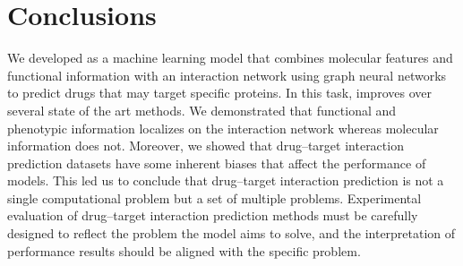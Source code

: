 \documentclass{bioinfo}
\begin{document}












\section{Conclusions}

We developed \name{} as a machine learning model that combines
molecular features and functional information with an interaction
network using graph neural networks to predict drugs that may target
specific proteins. In this task, \name{} improves over several state
of the art methods. We demonstrated that functional and phenotypic
information localizes on the interaction network whereas molecular
information does not. Moreover, we showed that drug--target
interaction prediction datasets have some inherent biases that affect
the performance of models. This led us to conclude that drug--target
interaction prediction is not a single computational problem but a set
of multiple problems. Experimental evaluation of drug--target
interaction prediction methods must be carefully designed to reflect
the problem the model aims to solve, and the interpretation of
performance results should be aligned with the specific problem.
\end{document}
